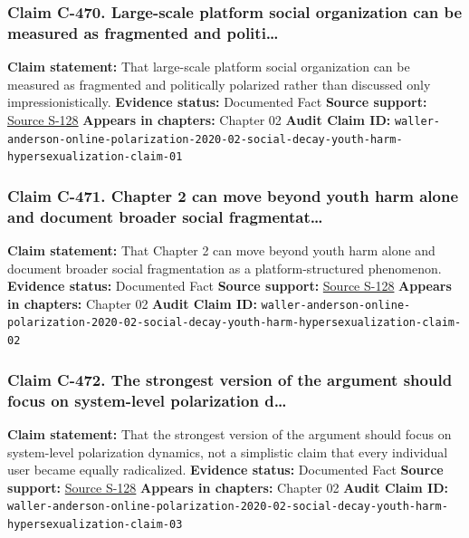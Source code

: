 \documentclass[
  american,
  11pt,
  letterpaper,
]{article}
\begin{document}
\subsubsection{Claim C-470. Large-scale platform social organization can
be measured as fragmented and
politi\ldots{}}\label{claim-c-470-large-scale-platform-social-organization-can-be-measured-as-fragmented-and-politi}

\textbf{Claim statement:} That large-scale platform social organization
can be measured as fragmented and politically polarized rather than
discussed only impressionistically. \textbf{Evidence status:} Documented
Fact \textbf{Source support:}
\hyperref[source-s-128-quantifying-social-organization-and-political-polarization-in-online-platforms]{Source
S-128} \textbf{Appears in chapters:} Chapter 02 \textbf{Audit Claim ID:}
\texttt{waller-anderson-online-polarization-2020-02-social-decay-youth-harm-hypersexualization-claim-01}

\subsubsection{Claim C-471. Chapter 2 can move beyond youth harm alone
and document broader social
fragmentat\ldots{}}\label{claim-c-471-chapter-2-can-move-beyond-youth-harm-alone-and-document-broader-social-fragmentat}

\textbf{Claim statement:} That Chapter 2 can move beyond youth harm
alone and document broader social fragmentation as a platform-structured
phenomenon. \textbf{Evidence status:} Documented Fact \textbf{Source
support:}
\hyperref[source-s-128-quantifying-social-organization-and-political-polarization-in-online-platforms]{Source
S-128} \textbf{Appears in chapters:} Chapter 02 \textbf{Audit Claim ID:}
\texttt{waller-anderson-online-polarization-2020-02-social-decay-youth-harm-hypersexualization-claim-02}

\subsubsection{Claim C-472. The strongest version of the argument should
focus on system-level polarization
d\ldots{}}\label{claim-c-472-the-strongest-version-of-the-argument-should-focus-on-system-level-polarization-d}

\textbf{Claim statement:} That the strongest version of the argument
should focus on system-level polarization dynamics, not a simplistic
claim that every individual user became equally radicalized.
\textbf{Evidence status:} Documented Fact \textbf{Source support:}
\hyperref[source-s-128-quantifying-social-organization-and-political-polarization-in-online-platforms]{Source
S-128} \textbf{Appears in chapters:} Chapter 02 \textbf{Audit Claim ID:}
\texttt{waller-anderson-online-polarization-2020-02-social-decay-youth-harm-hypersexualization-claim-03}
\end{document}
